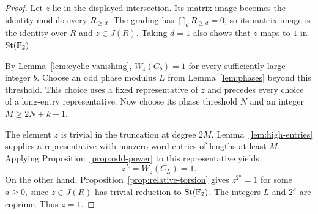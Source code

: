 \begin{proof}
Let $z$ lie in the displayed intersection. Its matrix image becomes
the identity modulo every $R_{\ge d}$. The grading has
$\bigcap_dR_{\ge d}=0$, so its matrix image is the identity over
$R$ and $z\in J(R)$. Taking $d=1$ also shows that $z$ maps to $1$
in $\operatorname{St}(\mathbb F_2)$.

By Lemma~\ref{lem:cyclic-vanishing}, $W_z(C_b)=1$ for every
sufficiently large integer $b$. Choose an odd phase modulus $L$
from Lemma~\ref{lem:phases} beyond this threshold. This choice uses
a fixed representative of $z$ and precedes every choice of a
long-entry representative. Now choose its phase threshold $N$ and
an integer $M\ge2N+k+1$.

The element $z$ is trivial in the truncation at degree $2M$.
Lemma~\ref{lem:high-entries} supplies a representative with
nonzero word entries of lengths at least $M$. Applying
Proposition~\ref{prop:odd-power} to this representative yields
\[
 z^L=W_z(C_L)=1.
\]
On the other hand, Proposition~\ref{prop:relative-torsion} gives
$z^{2^a}=1$ for some $a\ge0$, since $z\in J(R)$ has trivial
reduction to $\operatorname{St}(\mathbb F_2)$. The integers $L$ and $2^a$ are coprime.
Thus $z=1$.
\end{proof}

